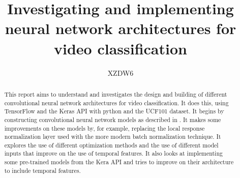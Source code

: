 
\title{Investigating and implementing neural network architectures for video classification}
\author{XZDW6}

\maketitle
\makedeclaration

\begin{abstract} %
 This report aims to understand and investigates the design and building of different convolutional neural network architectures for video classification. It does this, using TensorFlow and the Keras API with python and the UCF101 dataset.  It begins by constructing convolutional neural network models as described in \citep{KarpathyCVPR14}. It makes some improvements on these models by, for example, replacing the local response normalization layer used with the more modern batch normalization technique. It explores the use of different optimization methods and the use of different model inputs that improve on the use of temporal features. It also looks at implementing some pre-trained models from the Kera API and tries to improve on their architecture to include temporal features. 
\end{abstract}


\setcounter{tocdepth}{2} 

\tableofcontents
\listoffigures
\listoftables

